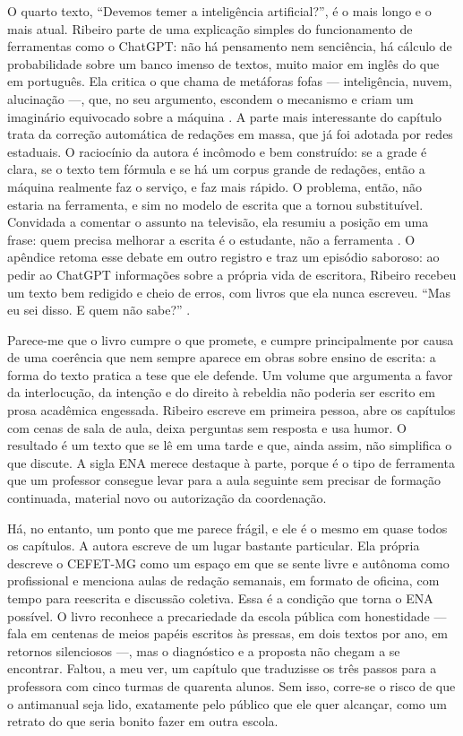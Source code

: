 \documentclass[portuguese]{textolivre}
\begin{document}
O quarto texto, “Devemos temer a inteligência artificial?”, é o mais longo e o mais atual. Ribeiro parte de uma explicação simples do funcionamento de ferramentas como o ChatGPT: não há pensamento nem senciência, há cálculo de probabilidade sobre um banco imenso de textos, muito maior em inglês do que em português. Ela critica o que chama de metáforas fofas — inteligência, nuvem, alucinação —, que, no seu argumento, escondem o mecanismo e criam um imaginário equivocado sobre a máquina \cite[p.~50]{ribeiro2025escrever}. A parte mais interessante do capítulo trata da correção automática de redações em massa, que já foi adotada por redes estaduais. O raciocínio da autora é incômodo e bem construído: se a grade é clara, se o texto tem fórmula e se há um corpus grande de redações, então a máquina realmente faz o serviço, e faz mais rápido. O problema, então, não estaria na ferramenta, e sim no modelo de escrita que a tornou substituível. Convidada a comentar o assunto na televisão, ela resumiu a posição em uma frase: quem precisa melhorar a escrita é o estudante, não a ferramenta \cite[p.~53]{ribeiro2025escrever}. O apêndice retoma esse debate em outro registro e traz um episódio saboroso: ao pedir ao ChatGPT informações sobre a própria vida de escritora, Ribeiro recebeu um texto bem redigido e cheio de erros, com livros que ela nunca escreveu. “Mas eu sei disso. E quem não sabe?” \cite[p.~81]{ribeiro2025escrever}.

Parece-me que o livro cumpre o que promete, e cumpre principalmente por causa de uma coerência que nem sempre aparece em obras sobre ensino de escrita: a forma do texto pratica a tese que ele defende. Um volume que argumenta a favor da interlocução, da intenção e do direito à rebeldia não poderia ser escrito em prosa acadêmica engessada. Ribeiro escreve em primeira pessoa, abre os capítulos com cenas de sala de aula, deixa perguntas sem resposta e usa humor. O resultado é um texto que se lê em uma tarde e que, ainda assim, não simplifica o que discute. A sigla ENA merece destaque à parte, porque é o tipo de ferramenta que um professor consegue levar para a aula seguinte sem precisar de formação continuada, material novo ou autorização da coordenação.

Há, no entanto, um ponto que me parece frágil, e ele é o mesmo em quase todos os capítulos. A autora escreve de um lugar bastante particular. Ela própria descreve o CEFET-MG como um espaço em que se sente livre e autônoma como profissional \cite[p.~23]{ribeiro2025escrever} e menciona aulas de redação semanais, em formato de oficina, com tempo para reescrita e discussão coletiva. Essa é a condição que torna o ENA possível. O livro reconhece a precariedade da escola pública com honestidade — fala em centenas de meios papéis escritos às pressas, em dois textos por ano, em retornos silenciosos —, mas o diagnóstico e a proposta não chegam a se encontrar. Faltou, a meu ver, um capítulo que traduzisse os três passos para a professora com cinco turmas de quarenta alunos. Sem isso, corre-se o risco de que o antimanual seja lido, exatamente pelo público que ele quer alcançar, como um retrato do que seria bonito fazer em outra escola.
\end{document}

